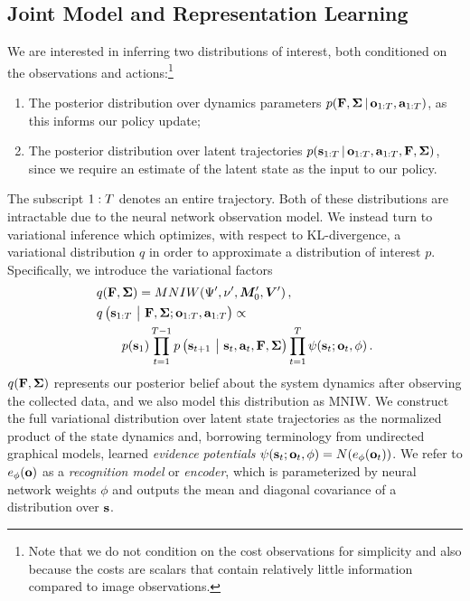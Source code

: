 \subsection{Joint Model and Representation Learning}
\label{sec:var-family}

We are interested in inferring two distributions of interest, both conditioned on the observations and actions:\footnote{Note that we do not condition on the cost observations for simplicity and also because the costs are scalars that contain relatively little information compared to image observations.}
\vspace{-.5em}
\begin{enumerate}
    \itemsep0em
    \item The posterior distribution over dynamics parameters $p(\mathbf{F},\bm{\Sigma}\,|\,\mathbf{o}_{1:T},\mathbf{a}_{1:T})$, as this informs our policy update;
    \item The posterior distribution over latent trajectories $p(\mathbf{s}_{1:T}\,|\,\mathbf{o}_{1:T},\mathbf{a}_{1:T},\mathbf{F},\bm{\Sigma})$, since we require an estimate of the latent state as the input to our policy.
\end{enumerate}
\vspace{-.5em}
The subscript $1:T$ denotes an entire trajectory. Both of these distributions are intractable due to the neural network observation model. We instead turn to variational inference which optimizes, with respect to KL-divergence, a variational distribution $q$ in order to approximate a distribution of interest $p$. Specifically, we introduce the variational factors
\begin{align*}
    &q(\mathbf{F},\bm{\Sigma})=MNIW(\Psi',\nu',\bm{M}_0',\bm{V}')\,,\\
    &q\left(\mathbf{s}_{1:T}~\big|~\mathbf{F},\bm{\Sigma};\mathbf{o}_{1:T},\mathbf{a}_{1:T}\right)\propto\\
    &\hspace{2em}p(\mathbf{s}_1)\prod_{t=1}^{T-1}p\left(\mathbf{s}_{t+1}~\big|~\mathbf{s}_t,\mathbf{a}_t,\mathbf{F},\bm{\Sigma}\right)\prod_{t=1}^{T}\psi(\mathbf{s}_t;\mathbf{o}_t,\phi)\,.
\end{align*}
$q(\mathbf{F},\bm{\Sigma})$ represents our posterior belief about the system dynamics after observing the collected data, and we also model this distribution as MNIW. We construct the full variational distribution over latent state trajectories as the normalized product of the state dynamics and, borrowing terminology from undirected graphical models, learned \emph{evidence potentials} $\psi(\mathbf{s}_t;\mathbf{o}_t,\phi)=N(e_\phi(\mathbf{o}_t))$. We refer to $e_\phi(\mathbf{o})$ as a \emph{recognition model} or \emph{encoder}, which is parameterized by neural network weights $\phi$ and outputs the mean and diagonal covariance of a distribution over $\mathbf{s}$.

